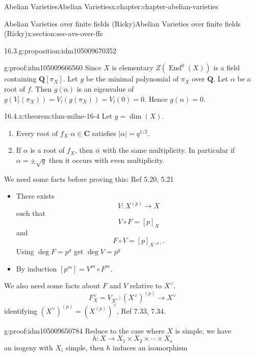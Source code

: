 \documentclass[oneside,10pt,]{book}
\numberwithin{equation}{section}
\newcommand{\lb}{[}
\newcommand{\rb}{]}
\newcommand{\QQ}{\mathbf{Q}}
\newcommand{\CC}{\mathbf{C}}
\DeclareMathOperator{\End}{End}
\begin{document}
\begin{chapterptx}{Abelian Varieties}{}{Abelian Varieties}{}{}{x:chapter:chapter-abelian-varieties}
\begin{sectionptx}{Abelian Varieties over finite fields (Ricky)}{}{Abelian Varieties over finite fields (Ricky)}{}{}{x:section:sec-avs-over-ffs}
\begin{proposition}{16.3.}{}{g:proposition:idm105009670352}
\end{proposition}
\begin{proofptx}{}{g:proof:idm105009666560}
Since \(X\) is elementary \(Z(\End^0(X))\) is  a field containing \(\QQ\lb \pi_X\rb\). Let \(g\) be the minimal polynomial of \(\pi_X\) over \(\QQ\). Let \(\alpha\) be a root of \(f\). Then \(g(\alpha)\) is an eigenvalue of \(g(V_l(\pi_X)) = V_l(g(\pi_X)) = V_l(0) = 0\). Hence \(g(\alpha) = 0\).%
\end{proofptx}
\begin{theorem}{16.4.}{}{x:theorem:thm-milne-16-4}%
Let \(g= \dim (X)\).%
\begin{enumerate}
\item{}Every root of \(f_X\) \(\alpha \in \CC\) satisfies \(|\alpha| = q^{1/2}\).%
\item{}If \(\alpha\) is  a root of \(f_X\), then \(\bar \alpha\) with the same multiplicity. In particular if \(\alpha = \pm \sqrt q\) then it occurs with even multiplicity.%
\end{enumerate}
%
\end{theorem}
We need some facts before proving this: Ref 5.20, 5.21%
\begin{itemize}[label=\textbullet]
\item{}There exists%
\begin{equation*}
V\colon X^{(p)} \to X
\end{equation*}
such that%
\begin{equation*}
V\circ F = [p]_X
\end{equation*}
and%
\begin{equation*}
F \circ V = [p]_{X^{(p)}}\text{.}
\end{equation*}
Using \(\deg F = p^g \)  get \(\deg V = p^g\)%
\item{}By induction \(\lb p^m\rb = V^m \circ F^m\).%
\end{itemize}
%
\par
We also need some facts about \(F\) and \(V\) relative to \(X^\vee\).%
\begin{equation*}
F_X^\vee = V_{X^\vee} \colon (X^\vee)^{(p)} \to X^\vee
\end{equation*}
identifying \((X^\vee)^{(p)} = (X^{(p)})^\vee\), Ref 7.33, 7.34.%
\begin{proofptx}{}{g:proof:idm105009650784}
Reduce to the case where \(X\) is simple, we have%
\begin{equation*}
h\colon X\to X_1 \times X_2 \times \cdots \times X_s
\end{equation*}
an isogeny with \(X_i\) simple, then \(h\) induces an isomorphism%

\end{proofptx}
\end{sectionptx}
\end{chapterptx}
\end{document}
